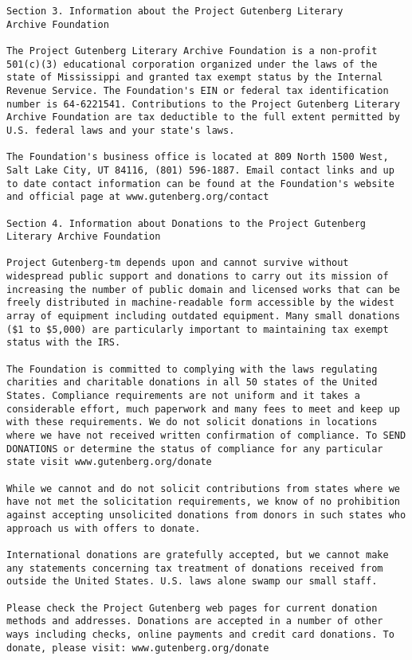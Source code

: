 \documentclass[oneside]{book}
\begin{document}
\begin{verbatim}
Section 3. Information about the Project Gutenberg Literary
Archive Foundation

The Project Gutenberg Literary Archive Foundation is a non-profit
501(c)(3) educational corporation organized under the laws of the
state of Mississippi and granted tax exempt status by the Internal
Revenue Service. The Foundation's EIN or federal tax identification
number is 64-6221541. Contributions to the Project Gutenberg Literary
Archive Foundation are tax deductible to the full extent permitted by
U.S. federal laws and your state's laws.

The Foundation's business office is located at 809 North 1500 West,
Salt Lake City, UT 84116, (801) 596-1887. Email contact links and up
to date contact information can be found at the Foundation's website
and official page at www.gutenberg.org/contact

Section 4. Information about Donations to the Project Gutenberg
Literary Archive Foundation

Project Gutenberg-tm depends upon and cannot survive without
widespread public support and donations to carry out its mission of
increasing the number of public domain and licensed works that can be
freely distributed in machine-readable form accessible by the widest
array of equipment including outdated equipment. Many small donations
($1 to $5,000) are particularly important to maintaining tax exempt
status with the IRS.

The Foundation is committed to complying with the laws regulating
charities and charitable donations in all 50 states of the United
States. Compliance requirements are not uniform and it takes a
considerable effort, much paperwork and many fees to meet and keep up
with these requirements. We do not solicit donations in locations
where we have not received written confirmation of compliance. To SEND
DONATIONS or determine the status of compliance for any particular
state visit www.gutenberg.org/donate

While we cannot and do not solicit contributions from states where we
have not met the solicitation requirements, we know of no prohibition
against accepting unsolicited donations from donors in such states who
approach us with offers to donate.

International donations are gratefully accepted, but we cannot make
any statements concerning tax treatment of donations received from
outside the United States. U.S. laws alone swamp our small staff.

Please check the Project Gutenberg web pages for current donation
methods and addresses. Donations are accepted in a number of other
ways including checks, online payments and credit card donations. To
donate, please visit: www.gutenberg.org/donate


\end{verbatim}
\end{document}
